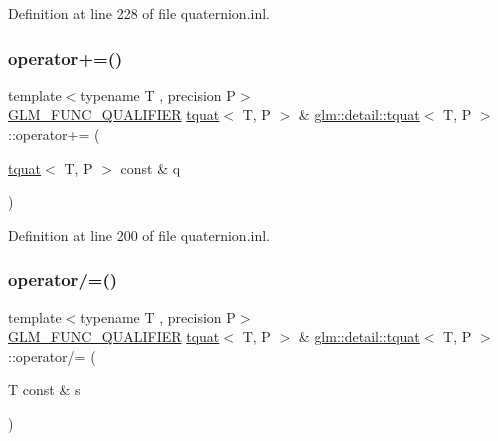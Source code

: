 Definition at line 228 of file quaternion.\+inl.

\mbox{\label{structglm_1_1detail_1_1tquat_af711fbfb41fee281c93d990afa15f01e}} 
\subsubsection{\texorpdfstring{operator+=()}{operator+=()}}
{\footnotesize\ttfamily template$<$typename T , precision P$>$ \\
\hyperlink{setup_8hpp_a33fdea6f91c5f834105f7415e2a64407}{G\+L\+M\+\_\+\+F\+U\+N\+C\+\_\+\+Q\+U\+A\+L\+I\+F\+I\+ER} \hyperlink{structglm_1_1detail_1_1tquat}{tquat}$<$ T, P $>$ \& \hyperlink{structglm_1_1detail_1_1tquat}{glm\+::detail\+::tquat}$<$ T, P $>$\+::operator+= (\begin{DoxyParamCaption}\item[{\hyperlink{structglm_1_1detail_1_1tquat}{tquat}$<$ T, P $>$ const \&}]{q }\end{DoxyParamCaption})}



Definition at line 200 of file quaternion.\+inl.

\mbox{\label{structglm_1_1detail_1_1tquat_a1a620ff3b4f138ad2f2fa34f36de1097}} 
\subsubsection{\texorpdfstring{operator/=()}{operator/=()}}
{\footnotesize\ttfamily template$<$typename T , precision P$>$ \\
\hyperlink{setup_8hpp_a33fdea6f91c5f834105f7415e2a64407}{G\+L\+M\+\_\+\+F\+U\+N\+C\+\_\+\+Q\+U\+A\+L\+I\+F\+I\+ER} \hyperlink{structglm_1_1detail_1_1tquat}{tquat}$<$ T, P $>$ \& \hyperlink{structglm_1_1detail_1_1tquat}{glm\+::detail\+::tquat}$<$ T, P $>$\+::operator/= (\begin{DoxyParamCaption}\item[{T const \&}]{s }\end{DoxyParamCaption})}



